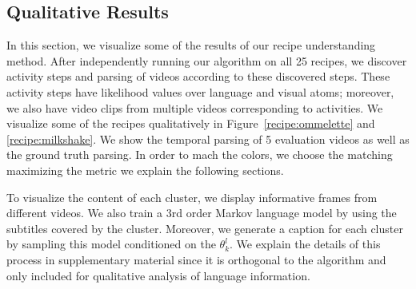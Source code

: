 \subsection{Qualitative Results}
In this section, we visualize some of  the results of our recipe understanding method. After independently running our algorithm on all 25 recipes, we discover activity steps and parsing of videos according to these discovered steps. These activity steps have likelihood values over language and visual atoms; moreover, we also have video clips from multiple videos corresponding to activities. We visualize some of the recipes qualitatively in Figure~\ref{recipe:ommelette} and \ref{recipe:milkshake}. We show the temporal parsing of 5 evaluation videos as well as the ground truth parsing. In order to mach the colors, we choose the matching maximizing the metric we explain the following sections.

To visualize the content of each cluster, we display informative frames from different videos. We also train a 3rd order Markov language model\cite{languageModel} by using the subtitles covered by the cluster. Moreover, we generate a caption for each cluster by sampling this model conditioned on the $\theta^l_k$. We explain the details of this process in supplementary material since it is orthogonal to the algorithm and only included for qualitative analysis of language information.

